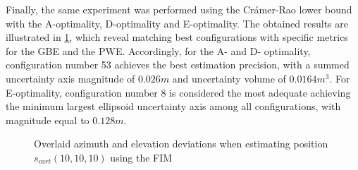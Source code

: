 Finally, the same experiment was performed using the Crámer-Rao lower bound with the A-optimality, D-optimality and E-optimality. The obtained results are illustrated in \ref{fig:both-101010-fim}, which reveal matching best configurations with specific metrics for the GBE and the PWE. Accordingly, for the A- and D- optimality, configuration number 53 achieves the best estimation precision, with a summed uncertainty axis magnitude of $0.026m$ and uncertainty volume of $0.0164m^3$. For E-optimality, configuration number 8 is considered the most adequate achieving the minimum largest ellipsoid uncertainty axis among all configurations, with magnitude equal to $0.128m$.

\begin{figure}[!htbp]
	\captionsetup{justification=centering,margin=2cm}
	\caption{Overlaid azimuth and elevation deviations when estimating position $s_{cart}(10,10,10)$ using the FIM}
	\label{fig:both-101010-fim}
\end{figure}

